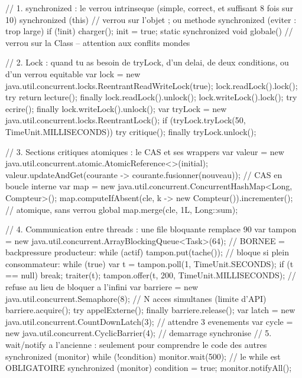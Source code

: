 \documentclass[12pt,a4paper,twoside,openright]{book}
\begin{document}
\begin{codejava}
// 1. synchronized : le verrou intrinseque (simple, correct, et suffisant 8 fois sur 10)
synchronized (this) {                 // verrou sur l'objet ; ou methode synchronized (eviter : trop large)
    if (!init) { charger(); init = true; }
}
static synchronized void globale() { }      // verrou sur la Class -- attention aux conflits mondes

// 2. Lock : quand tu as besoin de tryLock, d'un delai, de deux conditions, ou d'un verrou equitable
var lock = new java.util.concurrent.locks.ReentrantReadWriteLock(true);
lock.readLock().lock(); try { return lecture(); } finally { lock.readLock().unlock(); }
lock.writeLock().lock(); try { ecrire(); } finally { lock.writeLock().unlock(); }
var tryLock = new java.util.concurrent.locks.ReentrantLock();
if (tryLock.tryLock(50, TimeUnit.MILLISECONDS)) { try { critique(); } finally { tryLock.unlock(); } }

// 3. Sections critiques atomiques : le CAS et ses wrappers
var valeur = new java.util.concurrent.atomic.AtomicReference<>(initial);
valeur.updateAndGet(courante -> courante.fusionner(nouveau));     // CAS en boucle interne
var map = new java.util.concurrent.ConcurrentHashMap<Long, Compteur>();
map.computeIfAbsent(cle, k -> new Compteur()).incrementer();      // atomique, sans verrou global
map.merge(cle, 1L, Long::sum);

// 4. Communication entre threads : une file bloquante remplace 90 %
var tampon = new java.util.concurrent.ArrayBlockingQueue<Task>(64);   // BORNEE = backpressure
producteur: while (actif) { tampon.put(tache()); }                  // bloque si plein
consommateur: while (true) { var t = tampon.poll(1, TimeUnit.SECONDS); if (t == null) break; traiter(t); }
tampon.offer(t, 200, TimeUnit.MILLISECONDS);                        // refuse au lieu de bloquer a l'infini
var barriere = new java.util.concurrent.Semaphore(8);               // N acces simultanes (limite d'API)
barriere.acquire(); try { appelExterne(); } finally { barriere.release(); }
var latch = new java.util.concurrent.CountDownLatch(3);            // attendre 3 evenements
var cycle = new java.util.concurrent.CyclicBarrier(4);              // demarrage synchronise
// 5. wait/notify a l'ancienne : seulement pour comprendre le code des autres
synchronized (monitor) { while (!condition) { monitor.wait(500); } }   // le while est OBLIGATOIRE
synchronized (monitor) { condition = true; monitor.notifyAll(); }
\end{codejava}
\end{document}
